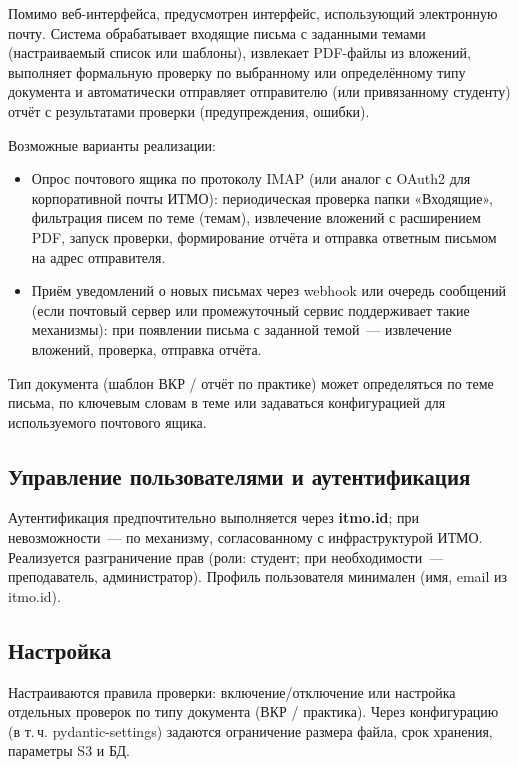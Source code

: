 Помимо веб-интерфейса, предусмотрен интерфейс, использующий электронную почту. Система обрабатывает входящие письма с заданными темами (настраиваемый список или шаблоны), извлекает PDF-файлы из вложений, выполняет формальную проверку по выбранному или определённому типу документа и автоматически отправляет отправителю (или привязанному студенту) отчёт с результатами проверки (предупреждения, ошибки).

Возможные варианты реализации:
\begin{itemize}
  \item Опрос почтового ящика по протоколу IMAP (или аналог с OAuth2 для корпоративной почты ИТМО): периодическая проверка папки «Входящие», фильтрация писем по теме (темам), извлечение вложений с расширением PDF, запуск проверки, формирование отчёта и отправка ответным письмом на адрес отправителя.
  \item Приём уведомлений о новых письмах через webhook или очередь сообщений (если почтовый сервер или промежуточный сервис поддерживает такие механизмы): при появлении письма с заданной темой~--- извлечение вложений, проверка, отправка отчёта.
\end{itemize}
Тип документа (шаблон ВКР / отчёт по практике) может определяться по теме письма, по ключевым словам в теме или задаваться конфигурацией для используемого почтового ящика.

\subsection{Управление пользователями и аутентификация}

Аутентификация предпочтительно выполняется через \textbf{itmo.id}; при невозможности~--- по механизму, согласованному с инфраструктурой ИТМО. Реализуется разграничение прав (роли: студент; при необходимости~--- преподаватель, администратор). Профиль пользователя минимален (имя, email из itmo.id).

\subsection{Настройка}

Настраиваются правила проверки: включение/отключение или настройка отдельных проверок по типу документа (ВКР / практика). Через конфигурацию (в т.\,ч. pydantic-settings) задаются ограничение размера файла, срок хранения, параметры S3 и БД.
